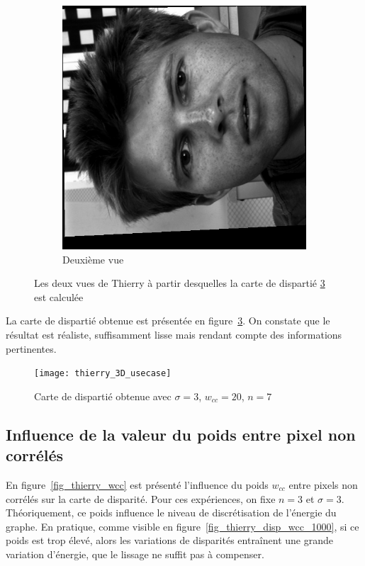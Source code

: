 \documentclass[12pt,a4paper,onecolumn]{article}
\begin{document}
\begin{figure}[H]
\begin{subfigure}[b]{0.45\textwidth}
		\includegraphics[width = \textwidth, angle = -90]{face01R}
		\caption{Deuxième vue}
		\label{fig_thierry_2}
	\end{subfigure}
	\caption{Les deux vues de Thierry à partir desquelles la carte de dispartié \ref{fig_thierry_3D} est calculée}
	\label{fig_thierry_initial}
\end{figure}

La carte de dispartié obtenue est présentée en figure~\ref{fig_thierry_3D}. On constate que le résultat est réaliste, suffisamment lisse mais rendant compte des informations pertinentes.

\begin{figure}[H]
	\centering
	\texttt{[image: thierry\_3D\_usecase]}
	\caption{Carte de dispartié obtenue avec \(\sigma = 3\), \(w_{cc} = 20\), \(n = 7\)}
	\label{fig_thierry_3D}
\end{figure}

\subsection{Influence de la valeur du poids entre pixel non corrélés}

En figure~\ref{fig_thierry_wcc} est présenté l'influence du poids \(w_{cc}\) entre pixels non corrélés sur la carte de disparité. Pour ces expériences, on fixe \(n = 3\) et \(\sigma = 3\). Théoriquement, ce poids influence le niveau de discrétisation de l'énergie du graphe. En pratique, comme visible en figure~\ref{fig_thierry_disp_wcc_1000}, si ce poids est trop élevé, alors les variations de disparités entraînent une grande variation d'énergie, que le lissage ne suffit pas à compenser.
\end{document}
